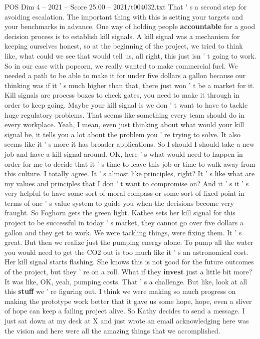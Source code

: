 \begin{textsample}{POS Dim 4 – 2021 – Score 25.00 – 2021/t004032.txt}
That ' s a second step for avoiding escalation.
The important thing with this is setting your targets and your benchmarks in advance.
One way of holding people \textbf{accountable} for a good decision process is to establish kill signals.
A kill signal was a mechanism for keeping ourselves honest, so at the beginning of the project, we tried to think like, what could we see that would tell us, all right, this just isn ' t going to work.
So in our case with popcorn, we really wanted to make commercial fuel.
We needed a path to be able to make it for under five dollars a gallon because our thinking was if it ' s much higher than that, there just won ' t be a market for it.
Kill signals are process boxes to check gates, you need to make it through in order to keep going.
Maybe your kill signal is we don ' t want to have to tackle huge regulatory problems.
That seems like something every team should do in every workplace.
Yeah, I mean, even just thinking about what would your kill signal be, it tells you a lot about the problem you ' re trying to solve.
It also seems like it ' s more it has broader applications.
So I should I should take a new job and have a kill signal around.
OK, here ' s what would need to happen in order for me to decide that it ' s time to leave this job or time to walk away from this culture.
I totally agree.
It ' s almost like principles, right?
It ' s like what are my values and principles that I don ' t want to compromise on?
And it ' s it ' s very helpful to have some sort of moral compass or some sort of fixed point in terms of one ' s value system to guide you when the decisions become very fraught.
So Foghorn gets the green light.
Kathee sets her kill signal for this project to be successful in today ' s market, they cannot go over five dollars a gallon and they get to work.
We were tackling things, were fixing them.
It ' s great.
But then we realize just the pumping energy alone.
To pump all the water you would need to get the CO2 out is too much like it ' s an astronomical cost.
Her kill signal starts flashing.
She knows this is not good for the future outcomes of the project, but they ' re on a roll.
What if they \textbf{invest} just a little bit more?
It was like, OK, yeah, pumping costs.
That ' s a challenge.
But like, look at all this \textbf{stuff} we ' re figuring out.
I think we were making so much progress on making the prototype work better that it gave us some hope, hope, even a sliver of hope can keep a failing project alive.
So Kathy decides to send a message.
I just sat down at my desk at X and just wrote an email acknowledging here was the vision and here were all the amazing things that we accomplished.

\end{textsample}
